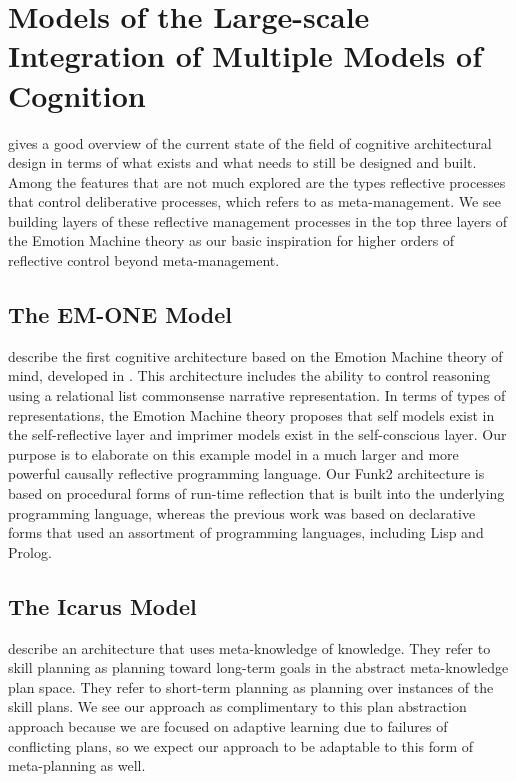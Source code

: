 \section{Models of the Large-scale Integration of Multiple Models of Cognition}

\cite{langley2008car} gives a good overview of the current state of the field of cognitive architectural design in terms of what exists and what needs to still be designed and built.
Among the features that are not much explored are the types reflective processes that control deliberative processes, which \cite{sloman2001vaa} refers to as meta-management.
We see building layers of these reflective management processes in the top three layers of the Emotion Machine theory as our basic inspiration for higher orders of reflective control beyond meta-management.

\subsection{The EM-ONE Model}

\cite{singh2005one} describe the first cognitive architecture based on the Emotion Machine theory of mind, developed in \cite{minsky2006em}.
This architecture includes the ability to control reasoning using a relational list commonsense narrative representation.
In terms of types of representations, the Emotion Machine theory proposes that self models exist in the self-reflective layer and imprimer models exist in the self-conscious layer.
Our purpose is to elaborate on this example model in a much larger and more powerful causally reflective programming language.
Our Funk2 architecture is based on procedural forms of run-time reflection that is built into the underlying programming language, whereas the previous work was based on declarative forms that used an assortment of programming languages, including Lisp and Prolog.

\subsection{The Icarus Model}

\cite{langley2005aap} describe an architecture that uses meta-knowledge of knowledge.
They refer to skill planning as planning toward long-term goals in the abstract meta-knowledge plan space.
They refer to short-term planning as planning over instances of the skill plans.
We see our approach as complimentary to this plan abstraction approach because we are focused on adaptive learning due to failures of conflicting plans, so we expect our approach to be adaptable to this form of meta-planning as well.

